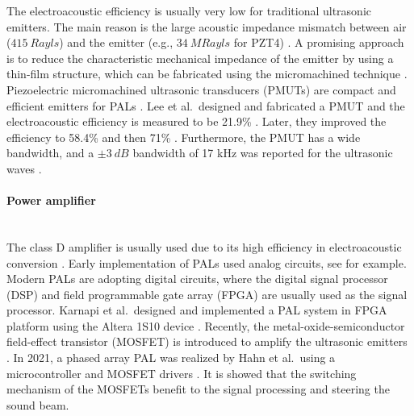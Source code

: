 The electroacoustic efficiency is usually very low for traditional ultrasonic emitters. 
The main reason is the large acoustic impedance mismatch between air ($\SI{415}{Rayls}$) and the emitter (e.g., $\SI{34}{MRayls}$ for PZT4) \cite{Gallego-Juarez1978UltrasonicTransducerHigh}.
A promising approach is to reduce the characteristic mechanical impedance of the emitter by using a {thin-film} structure, which can be fabricated using the micromachined technique \cite{Lee2009MicromachinedSourceTransducer}.
Piezoelectric micromachined ultrasonic transducers (PMUTs) are compact and efficient emitters for PALs .
Lee et al.\ designed and fabricated a PMUT and the electroacoustic efficiency is measured {to be} 21.9\% \cite{Lee2009MicromachinedSourceTransducer}.
Later, they improved the efficiency to 58.4\% \cite{Je2013ImpactMicromachinedUltrasonic} and {then} 71\% \cite{Je2015MicromachinedEfficientParametric}.
Furthermore, the PMUT has a wide bandwidth, and a $\pm\SI{3}{dB}$ bandwidth of 17 kHz was reported for the ultrasonic waves \cite{Je2015MicromachinedEfficientParametric}.


\paragraph{Power amplifier}\mbox{}\\
The class D amplifier is usually used due to its high efficiency in electroacoustic conversion \cite{Stark2007DirectDigitalPulse}.
Early implementation of PALs use{d} analog circuits, see \cite{Pompei2002SoundUltrasoundParametric} for example. 
Modern PALs are adopting digital circuits, where the digital signal processor (DSP) and field programmable gate array (FPGA) are usually used as the signal processor. 
Karnapi et al.\ designed and implemented a PAL system in FPGA platform using the Altera 1S10 device \cite{Karnapi2004FPGAImplementationParametric}.
{
    Recently, the metal-oxide-semiconductor field-effect transistor (MOSFET) is introduced to amplify the ultrasonic emitters \cite{Marzo2017UltrainoOpenPhasedarray, Hahn2021ParametricArrayUsing}. 
    In 2021, a phased array PAL was realized by Hahn et al.\ using a microcontroller and MOSFET drivers \cite{Hahn2021ParametricArrayUsing}. 
    It is showed that the switching mechanism of the MOSFETs benefit to the signal processing and steering the sound beam.
}


